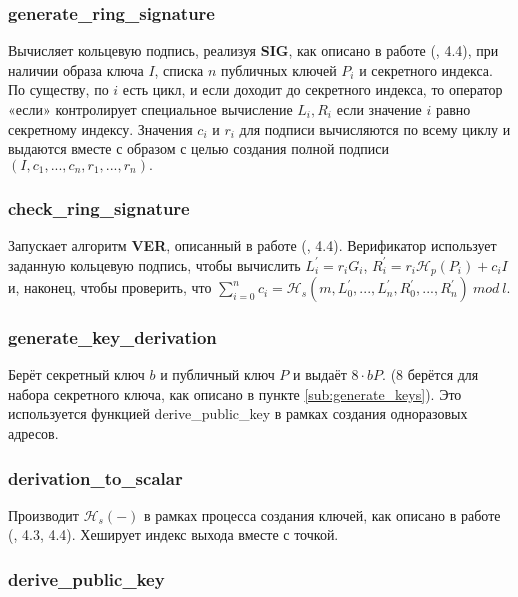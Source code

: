 \documentclass{mrl}
\numberwithin{equation}{section}
\numberwithin{figure}{section}
\begin{document}
\subsubsection{generate\_ring\_signature}

Вычисляет кольцевую подпись, реализуя \textbf{SIG}, как описано в работе (\cite{CN}, 4.4), при наличии образа ключа $I$, списка $n$ публичных ключей $P_{i}$ и секретного индекса. По существу, по $i$ есть цикл, и если доходит до секретного индекса, то оператор «если» контролирует специальное вычисление $L_{i},R_{i}$ если значение $i$ равно секретному индексу. Значения $c_{i}$ и $r_{i}$ для подписи вычисляются по всему циклу и выдаются вместе с образом с целью создания полной подписи $\left(I,c_{1},...,c_{n},r_{1},...,r_{n}\right).$

\subsubsection{check\_ring\_signature}

Запускает алгоритм \textbf{VER}, описанный в работе (\cite{CN}, 4.4). Верификатор использует заданную кольцевую подпись, чтобы вычислить $L_{i}^{\prime}=r_{i}G_{i}$, $R_{i}^{\prime}=r_{i}\mathcal{H}_{p}\left(P_{i}\right)+c_{i}I$ и, наконец, чтобы проверить, что $\sum_{i=0}^{n}c_{i}=\mathcal{H}_{s}\left(m,L_{0}^{\prime},...,L_{n}^{\prime},R_{0}^{\prime},...,R_{n}^{\prime}\right)\ mod\ l$.

\subsubsection{generate\_key\_derivation}

Берёт секретный ключ $b$ и публичный ключ $P$ и выдаёт $8\cdot bP$. ($8$ берётся для набора секретного ключа, как описано в пункте \ref{sub:generate_keys}). Это используется функцией derive\_public\_key в рамках создания одноразовых адресов.

\subsubsection{derivation\_to\_scalar}

Производит $\mathcal{H}_{s}\left(-\right)$ в рамках процесса создания ключей, как описано в работе (\cite{CN}, 4.3, 4.4). Хеширует индекс выхода вместе с точкой.

\subsubsection{derive\_public\_key}
\end{document}
